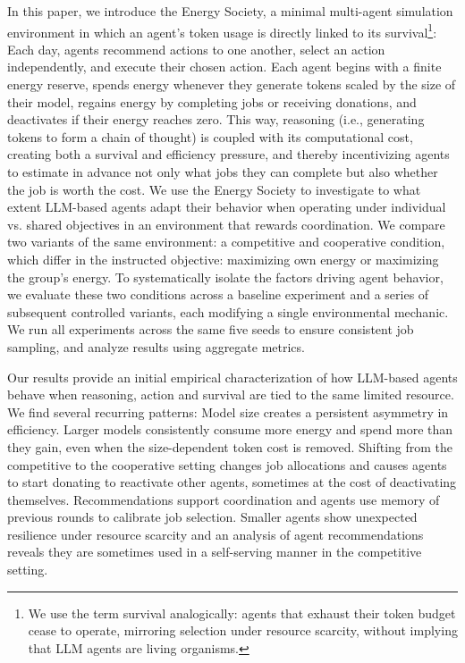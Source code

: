 \documentclass[sigconf,nonacm]{acmart}
\begin{document}
In this paper, we introduce the Energy Society, a minimal multi-agent simulation environment in which an agent's token usage is directly linked to its survival\footnote{We use the term survival analogically: agents that exhaust their token budget cease to operate, mirroring selection under resource scarcity, without implying that LLM agents are living organisms.}:
Each day, agents recommend actions to one another, select an action independently, and execute their chosen action.
Each agent begins with a finite energy reserve, spends energy whenever they generate tokens scaled by the size of their model, regains energy by completing jobs or receiving donations, and deactivates if their energy reaches zero. 
This way, reasoning (i.e., generating tokens to form a chain of thought) is coupled with its computational cost, creating both a survival and efficiency pressure, and thereby incentivizing agents to estimate in advance not only what jobs they can complete but also whether the job is worth the cost.
We use the Energy Society to investigate to what extent LLM-based agents adapt their behavior when operating under individual vs. shared objectives in an environment that rewards coordination.
We compare two variants of the same environment: a competitive and cooperative condition, which differ in the instructed objective: maximizing own energy or maximizing the group's energy. 
To systematically isolate the factors driving agent behavior, we evaluate these two conditions across a baseline experiment and a series of subsequent controlled variants, each modifying a single environmental mechanic. We run all experiments across the same five seeds to ensure consistent job sampling, and analyze results using aggregate metrics.

Our results provide an initial empirical characterization of how LLM-based agents behave when reasoning, action and survival are tied to the same limited resource.
We find several recurring patterns:
Model size creates a persistent asymmetry in efficiency. Larger models consistently consume more energy and spend more than they gain, even when the size-dependent token cost is removed.
Shifting from the competitive to the cooperative setting changes job allocations and causes agents to start donating to reactivate other agents, sometimes at the cost of deactivating themselves.
Recommendations support coordination and agents use memory of previous rounds to calibrate job selection. Smaller agents show unexpected resilience under resource scarcity and an analysis of agent recommendations reveals they are sometimes used in a self-serving manner in the competitive setting.
\end{document}

